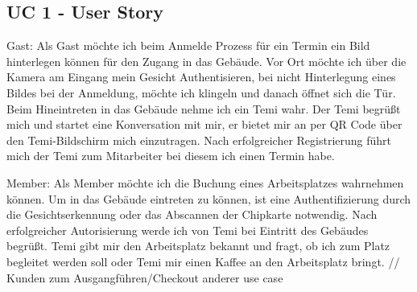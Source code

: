 \subsection*{UC 1 - User Story}
    Gast:
    Als Gast möchte ich beim Anmelde Prozess für ein Termin ein Bild hinterlegen können für den Zugang in das Gebäude. 
    Vor Ort möchte ich über die Kamera am Eingang mein Gesicht Authentisieren, bei nicht Hinterlegung eines Bildes 
    bei der Anmeldung, möchte ich klingeln und danach öffnet sich die Tür. Beim Hineintreten in das Gebäude nehme 
    ich ein Temi wahr. Der Temi begrüßt mich und startet eine Konversation mit mir, er bietet mir an per QR Code 
    über den Temi-Bildschirm mich einzutragen. Nach erfolgreicher Registrierung führt mich der Temi zum Mitarbeiter 
    bei diesem ich einen Termin habe.

    Member:
    Als Member möchte ich die Buchung eines Arbeitsplatzes wahrnehmen können. Um in das Gebäude eintreten zu 
    können, ist eine Authentifizierung durch die Gesichtserkennung oder das Abscannen der Chipkarte notwendig. Nach 
    erfolgreicher Autorisierung werde ich von Temi bei Eintritt des Gebäudes begrüßt. Temi gibt mir den Arbeitsplatz 
    bekannt und fragt, ob ich zum Platz begleitet werden soll oder Temi mir einen Kaffee an den Arbeitsplatz bringt. 
    // Kunden zum Ausgangführen/Checkout anderer use case


